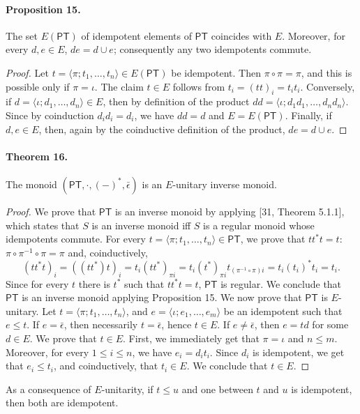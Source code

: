 \paragraph{Proposition 15.} The set $E(\mathsf{PT})$ of idempotent elements of $\mathsf{PT}$ coincides with $E$. Moreover, for every $d,e\in E$, $de=d\cup e$; consequently any two idempotents commute.
\begin{proof}
Let $t=\langle\pi;t_1,\ldots,t_n\rangle\in E(\mathsf{PT})$ be idempotent. Then $\pi\circ\pi=\pi$, and this is possible only if $\pi=\iota$.
The claim $t\in E$ follows from $t_i=(tt)_i=t_it_i$.
Conversely, if $d=\langle\iota;d_1,\ldots,d_n\rangle\in E$, then by definition of the product $dd=\langle\iota;d_1d_1,\ldots,d_nd_n\rangle$.
Since by coinduction $d_id_i=d_i$, we have $dd=d$ and $E=E(\mathsf{PT})$.
Finally, if $d,e\in E$, then, again by the coinductive definition of the product, $de=d\cup e$.
\end{proof}
\paragraph{Theorem 16.} The monoid $(\mathsf{PT},\cdot,(-)^*,\bar\epsilon)$ is an $E$-unitary inverse monoid.
\begin{proof}
We prove that $\mathsf{PT}$ is an inverse monoid by applying [31, Theorem 5.1.1], which states that $S$ is an inverse monoid iff $S$ is a regular monoid whose idempotents commute.
For every $t=\langle\pi;t_1,\ldots,t_n\rangle\in\mathsf{PT}$, we prove that $tt^*t=t$: $\pi\circ\pi^{-1}\circ\pi=\pi$ and, coinductively,
\[
(tt^*t)_i=((tt^*)t)_i=t_i(tt^*)_{\pi i}=t_i(t^*)_{\pi i}t_{(\pi^{-1}\circ\pi)i}=t_i(t_i)^*t_i=t_i.
\]
Since for every $t$ there is $t^*$ such that $tt^*t=t$, $\mathsf{PT}$ is regular. We conclude that $\mathsf{PT}$ is an inverse monoid applying Proposition 15.
We now prove that $\mathsf{PT}$ is $E$-unitary.
Let $t=\langle\pi;t_1,\ldots,t_n\rangle$, and $e=\langle\iota;e_1,\ldots,e_m\rangle$ be an idempotent such that $e\le t$.
If $e=\bar\epsilon$, then necessarily $t=\bar\epsilon$, hence $t\in E$.
If $e\ne\bar\epsilon$, then $e=td$ for some $d\in E$. We prove that $t\in E$.
First, we immediately get that $\pi=\iota$ and $n\le m$.
Moreover, for every $1\le i\le n$, we have $e_i=d_it_i$.
Since $d_i$ is idempotent, we get that $e_i\le t_i$, and coinductively, that $t_i\in E$. We conclude that $t\in E$.
\end{proof}
As a consequence of $E$-unitarity, if $t\le u$ and one between $t$ and $u$ is idempotent, then both are idempotent.
